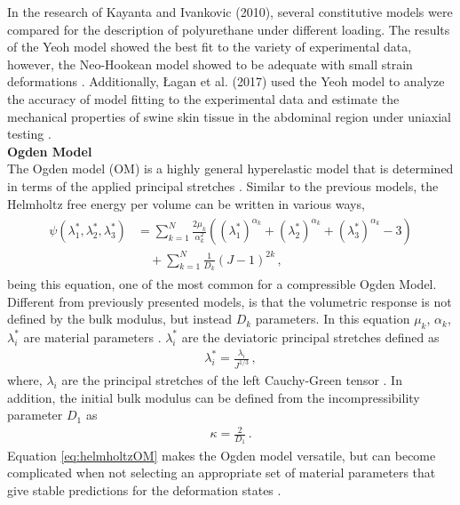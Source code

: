 In the research of Kayanta and Ivankovic (2010), several constitutive models were compared for the description 
of polyurethane under different loading. The results of the Yeoh model showed the best fit to the variety of experimental data, however, 
the Neo-Hookean model showed to be adequate with small strain deformations \cite{Kanyanta2010}.
Additionally, Łagan et al. (2017) used the Yeoh model to analyze the accuracy of model fitting 
to the experimental data and estimate the mechanical properties of swine skin tissue in the abdominal region under uniaxial testing \cite{Lagan2017}.\\

       
\textbf{Ogden Model}\\

The Ogden model (OM) is a highly general hyperelastic model that is determined in terms of the applied principal stretches \cite{Bergström2015}.
Similar to the previous models, the Helmholtz free energy per volume can be written in various ways, 
\begin{align}
        \begin{split}
        \psi(\lambda_1^*, \lambda_2^*, \lambda_3^*) &= \sum_{k=1}^N \frac{2\mu_k}{\alpha_k^2}((\lambda_1^*)^{\alpha_k} + (\lambda_2^*)^{\alpha_k} + (\lambda_3^*)^{\alpha_k} - 3) \\
        &\quad+ \sum_{k=1}^N \frac{1}{D_k}(J - 1)^{2k} \,,
        \end{split}
        \label{eq:helmholtzOM}
\end{align}
being this equation, one of the most common for a compressible Ogden Model. Different from previously presented models, is that 
the volumetric response is not defined by the bulk modulus, but instead $D_k$ parameters. In this equation
$\mu_k$, $\alpha_k$, $\lambda_i^*$ are material parameters \cite{Youssef2022}. $\lambda_i^*$ are the deviatoric principal stretches defined as
\begin{align}
        \lambda_i^* = \frac{\lambda_i}{J^{1/3}} \,,
\end{align}
where, $\lambda_i$ are the principal stretches of the left Cauchy-Green tensor \cite{Ansys2010}. In addition, the initial bulk modulus 
can be defined from the incompressibility parameter $D_1$ as 
\begin{align}
        \kappa = \frac{2}{D_1} \,.
\end{align}
Equation \ref{eq:helmholtzOM} makes the Ogden model versatile, but can become complicated when not selecting an appropriate 
set of material parameters that give stable predictions for the deformation states \cite{Bergström2015}. 
